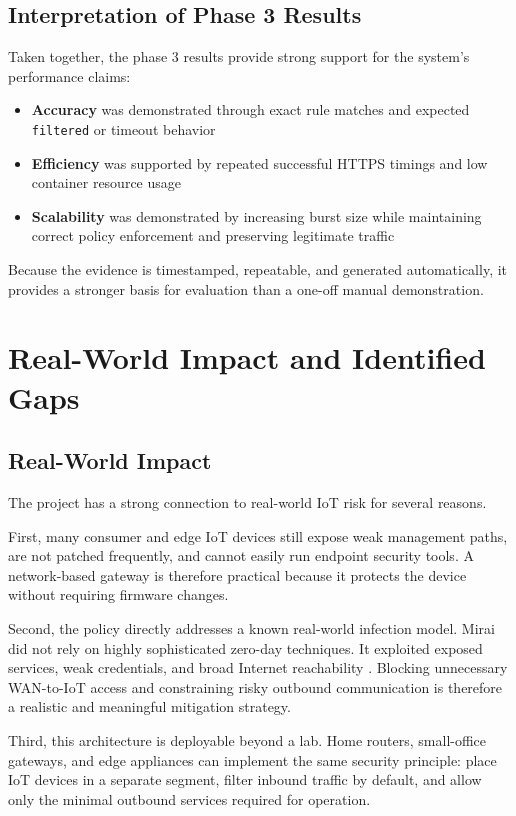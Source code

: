 \documentclass[journal]{IEEEtran}
\begin{document}
\subsection{Interpretation of Phase 3 Results}
Taken together, the phase 3 results provide strong support for the system's performance claims:
\begin{itemize}
\item \textbf{Accuracy} was demonstrated through exact rule matches and expected \texttt{filtered} or timeout behavior
\item \textbf{Efficiency} was supported by repeated successful HTTPS timings and low container resource usage
\item \textbf{Scalability} was demonstrated by increasing burst size while maintaining correct policy enforcement and preserving legitimate traffic
\end{itemize}

Because the evidence is timestamped, repeatable, and generated automatically, it provides a stronger basis for evaluation than a one-off manual demonstration.

\section{Real-World Impact and Identified Gaps}
\subsection{Real-World Impact}
The project has a strong connection to real-world IoT risk for several reasons.

First, many consumer and edge IoT devices still expose weak management paths, are not patched frequently, and cannot easily run endpoint security tools. A network-based gateway is therefore practical because it protects the device without requiring firmware changes.

Second, the policy directly addresses a known real-world infection model. Mirai did not rely on highly sophisticated zero-day techniques. It exploited exposed services, weak credentials, and broad Internet reachability \cite{mirai_usenix}. Blocking unnecessary WAN-to-IoT access and constraining risky outbound communication is therefore a realistic and meaningful mitigation strategy.

Third, this architecture is deployable beyond a lab. Home routers, small-office gateways, and edge appliances can implement the same security principle: place IoT devices in a separate segment, filter inbound traffic by default, and allow only the minimal outbound services required for operation.
\end{document}
